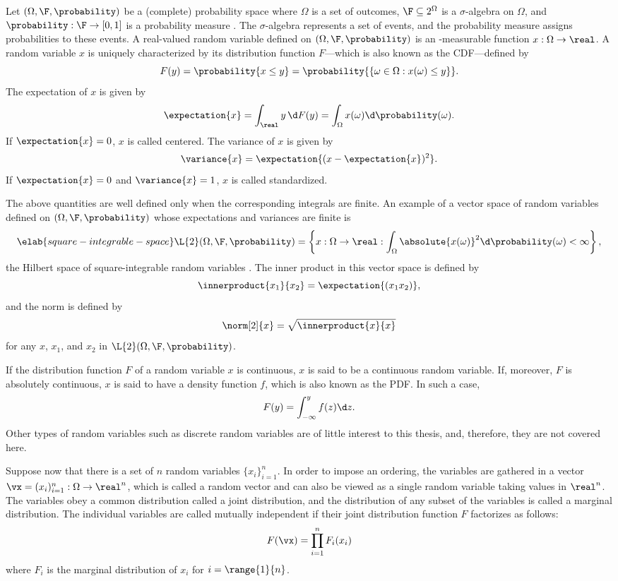 Let $(\Omega, \F, \probability)$ be a (complete) probability space where
$\Omega$ is a set of outcomes, $\F \subseteq 2^\Omega$ is a $\sigma$-algebra on
$\Omega$, and $\probability: \F \to [0, 1]$ is a probability measure
\cite{durrett2010}. The $\sigma$-algebra represents a set of events, and the
probability measure assigns probabilities to these events. A real-valued random
variable defined on $(\Omega, \F, \probability)$ is an \F-measurable function
$x: \Omega \to \real$. A random variable $x$ is uniquely characterized by its
distribution function $F$---which is also known as the \acf{CDF}---defined by
\begin{equation*}
  F(y) = \probability{x \leq y} = \probability{\{ \omega \in \Omega: x(\omega) \leq y \}}.
\end{equation*}
The expectation of $x$ is given by
\[
  \expectation{x} = \int_\real y \, \d F(y) = \int_\Omega x(\omega) \d \probability(\omega).
\]
If $\expectation{x} = 0$, $x$ is called centered. The variance of $x$ is given
by
\[
  \variance{x} = \expectation{(x - \expectation{x})^2}.
\]
If $\expectation{x} = 0$ and $\variance{x} = 1$, $x$ is called standardized.

The above quantities are well defined only when the corresponding integrals are
finite. An example of a vector space of random variables defined on $(\Omega,
\F, \probability)$ whose expectations and variances are finite is
\begin{equation} \elab{square-integrable-space}
  \L{2}(\Omega, \F, \probability) = \left\{ x: \Omega \to \real: \int_\Omega \absolute{x(\omega)}^2 \d \probability(\omega) < \infty \right\},
\end{equation}
the Hilbert space of square-integrable random variables \cite{janson1997}. The
inner product in this vector space is defined by
\[
  \innerproduct{x_1}{x_2} = \expectation{(x_1 x_2)},
\]
and the norm is defined by
\[
  \norm[2]{x} = \sqrt{\innerproduct{x}{x}}
\]
for any $x$, $x_1$, and $x_2$ in $\L{2}(\Omega, \F, \probability)$.

If the distribution function $F$ of a random variable $x$ is continuous, $x$ is
said to be a continuous random variable. If, moreover, $F$ is absolutely
continuous, $x$ is said to have a density function $f$, which is also known as
the \acf{PDF}. In such a case,
\[
  F(y) = \int_{-\infty}^y f(z) \d z.
\]
Other types of random variables such as discrete random variables are of little
interest to this thesis, and, therefore, they are not covered here.

Suppose now that there is a set of $n$ random variables $\{ x_i \}_{i = 1}^n$.
In order to impose an ordering, the variables are gathered in a vector $\vx =
(x_i)_{i = 1}^n: \Omega \to \real^n$, which is called a random vector and can
also be viewed as a single random variable taking values in $\real^n$. The
variables obey a common distribution called a joint distribution, and the
distribution of any subset of the variables is called a marginal distribution.
The individual variables are called mutually independent if their joint
distribution function $F$ factorizes as follows:
\[
  F(\vx) = \prod_{i = 1}^n F_i(x_i)
\]
where $F_i$ is the marginal distribution of $x_i$ for $i = \range{1}{n}$.


